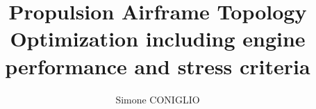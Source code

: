 \usepackage[T1]{fontenc}
\usepackage{aecompl}
\usepackage[english]{babel} %
\usepackage{csquotes}
\usepackage{marginnote}
\usepackage{verbatim}
\usepackage[ED=MITT-STICRT, Ets=ISAE]{templates/tlsflyleaf}
\usepackage{graphicx}
\usepackage[export]{adjustbox}
\title{Propulsion Airframe Topology Optimization including engine performance and stress criteria}
\author{Simone CONIGLIO	}


\usepackage{amsmath,amssymb}
\usepackage{mathrsfs}
\usepackage{amsthm}
\usepackage{a4wide}
\usepackage[framemethod=default]{mdframed}
\renewcommand{\baselinestretch}{1.05}

\usepackage[linesnumbered,lined,boxed,commentsnumbered]{algorithm2e}
\usepackage{algpseudocode} 
\usepackage[hyperindex=true]{hyperref}
\graphicspath{{.}{images/}}
\usepackage{eso-pic}
\usepackage{rotating}
\usepackage[font=normalsize]{subfig}
\usepackage{tikz}
\usetikzlibrary{shapes,arrows}
\usepackage{pgfplots}
\pgfplotsset{compat=newest}
\pgfplotsset{plot coordinates/math parser=false}
\newlength\figureheight
\newlength\figurewidth
\usepackage{cite}


\usetikzlibrary{plotmarks}
\usepackage{pdfpages}

\usepackage[strict]{changepage}
\newcommand\BackgroundPic{
\put(0,0){
\parbox[b][\paperheight]{\paperwidth}{%
\vfill
\centering
\texttt{[image: images/background-eps-converted-to]}%
\vfill
}}}

